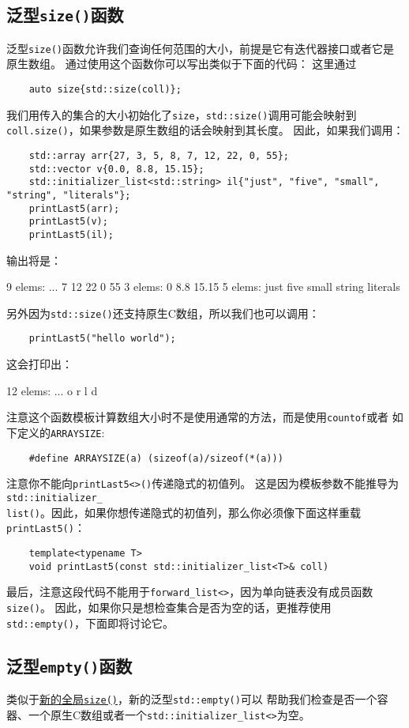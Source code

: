 \subsection{泛型\texttt{size()}函数}\label{ch25.1.1}
泛型\texttt{size()}函数允许我们查询任何范围的大小，前提是它有迭代器接口或者它是原生数组。
通过使用这个函数你可以写出类似于下面的代码：
这里通过
\begin{lstlisting}
    auto size{std::size(coll)};
\end{lstlisting}
我们用传入的集合的大小初始化了\texttt{size}，\texttt{std::size()}调用可能会映射到
\texttt{coll.size()}，如果参数是原生数组的话会映射到其长度。
因此，如果我们调用：
\begin{lstlisting}
    std::array arr{27, 3, 5, 8, 7, 12, 22, 0, 55};
    std::vector v{0.0, 8.8, 15.15};
    std::initializer_list<std::string> il{"just", "five", "small", "string", "literals"};
    printLast5(arr);
    printLast5(v);
    printLast5(il);
\end{lstlisting}
输出将是：
\begin{blacklisting}
    9 elems: ... 7 12 22 0 55
    3 elems: 0 8.8 15.15
    5 elems: just five small string literals
\end{blacklisting}
另外因为\texttt{std::size()}还支持原生C数组，所以我们也可以调用：
\begin{lstlisting}
    printLast5("hello world");
\end{lstlisting}
这会打印出：
\begin{blacklisting}
    12 elems: ... o r l d
\end{blacklisting}
注意这个函数模板计算数组大小时不是使用通常的方法，而是使用\texttt{countof}或者
如下定义的\texttt{ARRAYSIZE}:
\begin{lstlisting}
    #define ARRAYSIZE(a) (sizeof(a)/sizeof(*(a)))
\end{lstlisting}
注意你不能向\texttt{printLast5<>()}传递隐式的初值列。
这是因为模板参数不能推导为\texttt{std::initializer\_\\
list()}。因此，如果你想传递隐式的初值列，那么你必须像下面这样重载\texttt{printLast5()}：
\begin{lstlisting}
    template<typename T>
    void printLast5(const std::initializer_list<T>& coll)
\end{lstlisting}
最后，注意这段代码不能用于\texttt{forward\_list<>}，因为单向链表没有成员函数\texttt{size()}。
因此，如果你只是想检查集合是否为空的话，更推荐使用\texttt{std::empty()}，下面即将讨论它。

\subsection{泛型\texttt{empty()}函数}
类似于\hyperref[ch25.1.1]{新的全局\texttt{size()}}，新的泛型\texttt{std::empty()}可以
帮助我们检查是否一个容器、一个原生C数组或者一个\texttt{std::initializer\_list<>}为空。

